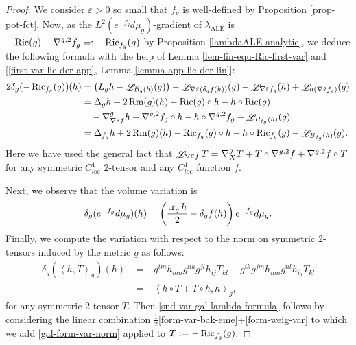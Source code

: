 \documentclass[a4paper,11pt,reqno]{amsart}
\def\Ric{\mathop{\rm Ric}\nolimits}
\def\Rm{\mathop{\rm Rm}\nolimits}
\def\tr{\mathop{\rm tr}\nolimits}
\def\Li{\mathop{\rm \mathscr{L}}\nolimits}
\def\Ric{\mathop{\rm Ric}\nolimits}
\def\Rm{\mathop{\rm Rm}\nolimits}
\def\tr{\mathop{\rm tr}\nolimits}
\def\Li{\mathop{\rm \mathscr{L}}\nolimits}
\numberwithin{equation}{section}
\begin{document}
		\begin{proof}
		We consider $\varepsilon>0$ so small that $f_g$ is well-defined by Proposition \ref{prop-pot-fct}. Now, as the $L^2(e^{-f_g}d\mu_g)$-gradient of $\lambda_{\operatorname{ALE}}$ is $-\Ric(g)-\nabla^{g,2}f_g=:-\Ric_{f_g}(g)$ by Proposition \ref{lambdaALE analytic}, we deduce the following formula with the help of Lemma \ref{lem-lin-equ-Ric-first-var} and [\eqref{first-var-lie-der-app}, Lemma \ref{lemma-app-lie-der-lin}]:
		\begin{equation}
\begin{split}\label{form-var-bak-eme}
2\delta_g(-\Ric_{f_g}(g))(h)&=\left(L_gh-\Li_{B_g(h)}(g)\right)-\Li_{\nabla^g(\delta_gf(h))}(g)-\Li_{\nabla^gf_g}(h)+\Li_{h(\nabla^gf_g)}(g)\\
&=\Delta_gh+2\Rm(g)(h)-\Ric(g)\circ h-h\circ\Ric(g)\\
&\quad-\nabla^g_{\nabla^gf}h-\nabla^{g,2}f_g\circ h-h\circ\nabla^{g,2}f_g-\Li_{B_{f_g}(h)}(g)\\
&=\Delta_{f_g}h+2\Rm(g)(h)-\Ric_{f_g}(g)\circ h-h\circ\Ric_{f_g}(g)-\Li_{B_{f_g}(h)}(g).
\end{split}
\end{equation}
Here we have used the general fact that $\Li_{\nabla^gf}T=\nabla^g_XT+T\circ\nabla^{g,2}f+\nabla^{g,2}f\circ T$ for any symmetric $C^1_{loc}$ $2$-tensor and any $C^1_{loc}$ function $f$.

Next, we observe that the volume variation is 
\begin{equation}\label{form-weig-var}
\delta_g(e^{-f_g}d\mu_g)(h)=\left(\frac{\tr_gh}{2}-\delta_gf(h)\right)e^{-f_g}d\mu_g.
\end{equation}
Finally, we compute the variation with respect to the norm on symmetric $2$-tensors induced by the metric $g$ as follows:
\begin{equation}
\begin{split}\label{gal-form-var-norm}
\delta_g\left(\left\langle h,T\right\rangle_g\right)(h)&=-g^{im}h_{mn}g^{nk}g^{jl}h_{ij}T_{kl}-g^{ik}g^{jm}h_{mn}g^{nl}h_{ij}T_{kl}\\
&=-\left\langle h\circ T+T\circ h,h\right\rangle_g,
\end{split}
\end{equation}
for any symmetric $2$-tensor $T$. Then \eqref{snd-var-gal-lambda-formula} follows by considering the linear combination $\frac{1}{2}$\eqref{form-var-bak-eme}+\eqref{form-weig-var} to which we add \eqref{gal-form-var-norm} applied to $T:=-\Ric_{f_g}(g)$.

		
		\end{proof}
		
\end{document}
